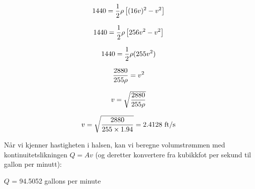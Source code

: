 $$1440 = {1 \over 2} \rho \left[ (16v)^2 - v^2 \right]$$

$$1440 = {1 \over 2} \rho \left[ 256v^2 - v^2 \right]$$

$$1440 = {1 \over 2} \rho (255v^2)$$

$${2880 \over {255 \rho}} = v^2$$

$$v = \sqrt{{2880 \over {255 \rho}}}$$

$$v = \sqrt{{2880 \over {255 \times 1.94}}} = 2.4128 \hbox{ ft/s}$$

\vskip 10pt

Når vi kjenner hastigheten i halsen, kan vi beregne volumstrømmen med kontinuitetslikningen $Q = Av$ (og deretter konvertere fra kubikkfot per sekund til gallon per minutt):

\vskip 10pt

$Q$ = 94.5052 gallons per minute


